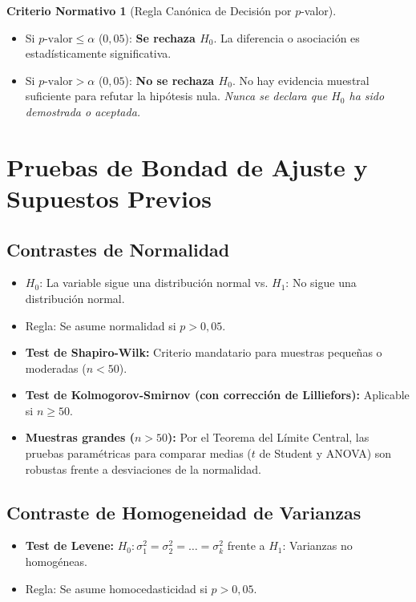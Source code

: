\documentclass[11pt,a4paper]{report}
\theoremstyle{definition}
\newtheorem{criterio}{Criterio Normativo}[chapter]
\begin{document}
\begin{criterio}[Regla Canónica de Decisión por $p$-valor]
\begin{itemize}
    \item Si $p\text{-valor} \le \alpha$ ($0{,}05$): \textbf{Se rechaza $H_0$}. La diferencia o asociación es estadísticamente significativa.
    \item Si $p\text{-valor} > \alpha$ ($0{,}05$): \textbf{No se rechaza $H_0$}. No hay evidencia muestral suficiente para refutar la hipótesis nula. \emph{Nunca se declara que $H_0$ ha sido demostrada o aceptada.}
\end{itemize}
\end{criterio}

\section{Pruebas de Bondad de Ajuste y Supuestos Previos}

\subsection{Contrastes de Normalidad}
\begin{itemize}[leftmargin=*]
    \item $H_0$: La variable sigue una distribución normal vs. $H_1$: No sigue una distribución normal.
    \item Regla: Se asume normalidad si $p > 0{,}05$.
    \item \textbf{Test de Shapiro-Wilk:} Criterio mandatario para muestras pequeñas o moderadas ($n < 50$).
    \item \textbf{Test de Kolmogorov-Smirnov (con corrección de Lilliefors):} Aplicable si $n \ge 50$.
    \item \textbf{Muestras grandes ($n > 50$):} Por el Teorema del Límite Central, las pruebas paramétricas para comparar medias ($t$ de Student y ANOVA) son robustas frente a desviaciones de la normalidad.
\end{itemize}

\subsection{Contraste de Homogeneidad de Varianzas}
\begin{itemize}[leftmargin=*]
    \item \textbf{Test de Levene:} $H_0: \sigma_1^2 = \sigma_2^2 = \dots = \sigma_k^2$ frente a $H_1$: Varianzas no homogéneas.
    \item Regla: Se asume homocedasticidad si $p > 0{,}05$.
\end{itemize}
\end{document}
